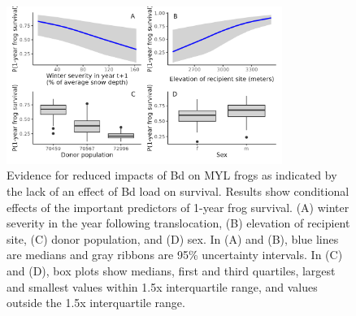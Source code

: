 \documentclass[9pt,twocolumn,twoside,lineno]{pnas-new}
\begin{document}
\begin{figure}

{\centering \includegraphics[width=0.8\textwidth]{figures/cond_effects_plot.png}

}

\caption{\label{fig-cond-effects}Evidence for reduced impacts of Bd on
MYL frogs as indicated by the lack of an effect of Bd load on survival.
Results show conditional effects of the important predictors of 1-year
frog survival. (A) winter severity in the year following translocation,
(B) elevation of recipient site, (C) donor population, and (D) sex. In
(A) and (B), blue lines are medians and gray ribbons are 95\%
uncertainty intervals. In (C) and (D), box plots show medians, first and
third quartiles, largest and smallest values within 1.5x interquartile
range, and values outside the 1.5x interquartile range.}

\end{figure}

\newpage
\end{document}

